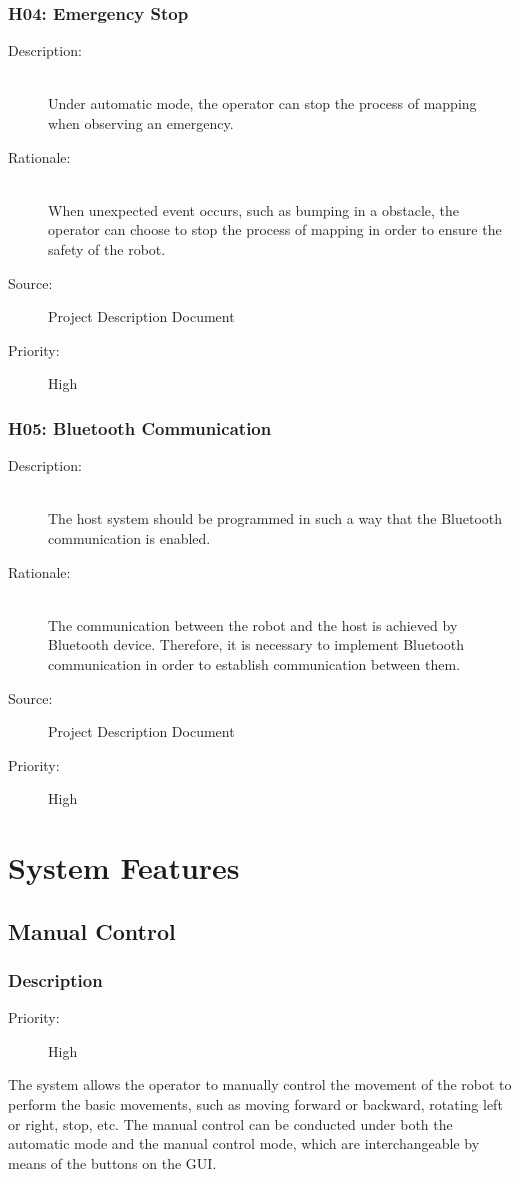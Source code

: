 \documentclass[titlepage]{article}
\begin{document}
\subsubsection{H04: Emergency Stop }
\begin{description}
\item[Description: ] \hfill \\Under automatic mode, the operator can stop the process of mapping when observing an emergency.
\item[Rationale: ] \hfill \\ When unexpected event occurs, such as bumping in a obstacle, the operator can choose to stop the process of mapping in order to ensure the safety of the robot.
\item[Source: ] Project Description Document
\item[Priority: ] High
\end{description}

\subsubsection{H05: Bluetooth Communication }
\begin{description}
\item[Description: ] \hfill \\The host system should be programmed in such a way that the Bluetooth communication is enabled.
\item[Rationale: ] \hfill \\ The communication between the robot and the host is achieved by Bluetooth device. Therefore, it is necessary to implement Bluetooth communication in order to establish communication between them.
\item[Source: ] Project Description Document
\item[Priority: ] High
\end{description}


\newpage








\section{System Features}
\subsection{Manual Control}
\subsubsection{Description}
\begin{description}
\item[Priority: ] High
\end{description}
The system allows the operator to manually control the movement of the robot to perform the basic movements, such as moving forward or backward, rotating left or right, stop, etc. The manual control can be conducted under both the automatic mode and the manual control mode, which are interchangeable by means of the buttons on the GUI.
\end{document}
